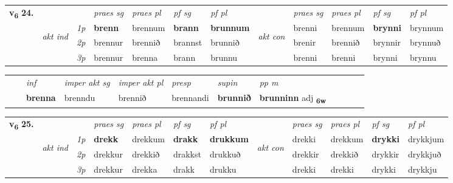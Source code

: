 \begin{tabular}{llllllllllll} \toprule
\multirow{4}{*}{{{\textbf{v{\textsubscript{6}}} \Large{\textbf{24.}}}}}  & &   &  \textit{praes sg}  & \textit{praes pl}  &\textit{ pf sg} & \textit{pf pl} &  &  \textit{praes sg}  & \textit{praes pl}  & \textit{pf sg} & \textit{pf pl } \\*
	\cmidrule{4-7} \cmidrule{9-12}
 & \multirow{3}{*}{\begin{turn}{90}\textit{akt ind}\end{turn}} & {\textit{1p}} & \textbf{brenn} & brennum    & \textbf{brann} & \textbf{brunnum} & \multirow{3}{*}{\begin{turn}{90}\textit{akt con}\end{turn}} &brenni & brennum & \textbf{brynni} & brynnum\\*
& &  {\textit{2p}} &  brennur  & brennið   & brannst & brunnið & & brenir & brennið & brynnir & brynnuð \\*
& &  {\textit{3p}} & brennur & brenna   & brann & brunnu & & brenni & brenni& brynni & brynnu  \\*
\cmidrule{4-7} \cmidrule{9-12}
\end{tabular}


\begin{tabular}{llllllllllll}
 & & \textit{inf} & \textit{imper akt sg} & \textit{imper akt pl}   & \textit{presp} & \textit{supin}  & \textit{pp m}     \\*
  & & \textbf{brenna} & brenndu  & brennið   & brennandi &  \textbf{brunnið}  & \textbf{brunninn} adj \textbf{\textsubscript{6w}} \\*
\cmidrule{1-12}
\end{tabular}



\begin{tabular}{llllllllllll} \toprule
\multirow{4}{*}{{{\textbf{v{\textsubscript{6}}} \Large{\textbf{25.}}}}}  & &   &  \textit{praes sg}  & \textit{praes pl}  &\textit{ pf sg} & \textit{pf pl} &  &  \textit{praes sg}  & \textit{praes pl}  & \textit{pf sg} & \textit{pf pl } \\*
	\cmidrule{4-7} \cmidrule{9-12}
 & \multirow{3}{*}{\begin{turn}{90}\textit{akt ind}\end{turn}} & {\textit{1p}} & \textbf{drekk} & drekkum    & \textbf{drakk} & \textbf{drukkum} & \multirow{3}{*}{\begin{turn}{90}\textit{akt con}\end{turn}} &drekki & drekkum & \textbf{drykki} & drykkjum\\*
& &  {\textit{2p}} &  drekkur  & drekkið   & drakkst & drukkuð & & drekkir & drekkið & drykkir & drykkjuð \\*
& &  {\textit{3p}} & drekkur & drekka   & drakk & drukku & & drekki & drekki& drykki & drykkju  \\*
\cmidrule{4-7} \cmidrule{9-12}
\end{tabular}


